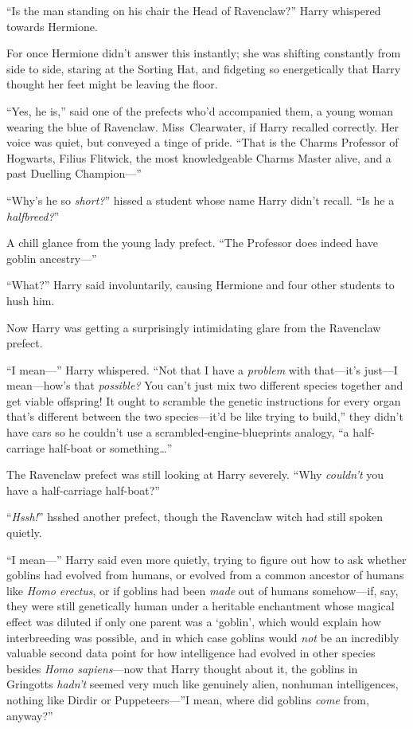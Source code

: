 “Is the man standing on his chair the Head of Ravenclaw?” Harry whispered
towards Hermione.

For once Hermione didn’t answer this instantly; she was shifting constantly
from side to side, staring at the Sorting Hat, and fidgeting so energetically
that Harry thought her feet might be leaving the floor.

“Yes, he is,” said one of the prefects who’d accompanied them, a young woman
wearing the blue of Ravenclaw. Miss~Clearwater, if Harry recalled correctly.
Her voice was quiet, but conveyed a tinge of pride. “That is the Charms
Professor of Hogwarts, Filius Flitwick, the most knowledgeable Charms Master
alive, and a past Duelling Champion—”

“Why’s he so \emph{short?}” hissed a student whose name Harry didn’t recall.
“Is he a \emph{halfbreed?}”

A chill glance from the young lady prefect. “The Professor does indeed have
goblin ancestry—”

“What?” Harry said involuntarily, causing Hermione and four other students to
hush him.

Now Harry was getting a surprisingly intimidating glare from the Ravenclaw
prefect.

“I mean—” Harry whispered. “Not that I have a \emph{problem} with that—it’s
just—I mean—how’s that \emph{possible?} You can’t just mix two different
species together and get viable offspring! It ought to scramble the genetic
instructions for every organ that’s different between the two species—it’d be
like trying to build,” they didn’t have cars so he couldn’t use a
scrambled-engine-blueprints analogy, “a half-carriage half-boat or
something…”

The Ravenclaw prefect was still looking at Harry severely. “Why \emph{couldn’t}
you have a half-carriage half-boat?”

“\emph{Hssh!}” hsshed another prefect, though the Ravenclaw witch had still
spoken quietly.

“I mean—” Harry said even more quietly, trying to figure out how to ask
whether goblins had evolved from humans, or evolved from a common ancestor of
humans like \emph{Homo erectus}, or if goblins had been \emph{made} out of
humans somehow—if, say, they were still genetically human under a heritable
enchantment whose magical effect was diluted if only one parent was a ‘goblin’,
which would explain how interbreeding was possible, and in which case goblins
would \emph{not} be an incredibly valuable second data point for how
intelligence had evolved in other species besides \emph{Homo sapiens}—now
that Harry thought about it, the goblins in Gringotts \emph{hadn’t} seemed very
much like genuinely alien, nonhuman intelligences, nothing like Dirdir or
Puppeteers—”I mean, where did goblins \emph{come} from, anyway?”

